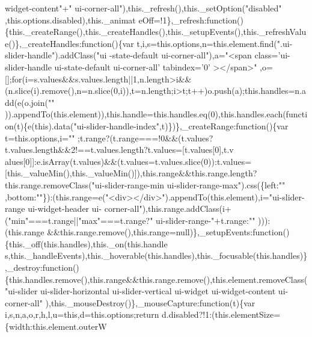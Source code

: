 \begin{DoxyCode}
{      widget-content\textcolor{stringliteral}{"+"} ui-corner-all\textcolor{stringliteral}{"),this.\_refresh(),this.\_setOption("}disabled\textcolor{stringliteral}{"
      ,this.options.disabled),this.\_animat
      eOff=!1\},\_refresh:function()\{this.\_createRange(),this.\_createHandles(),this.\_setupEvents(),this.\_refreshValue()\},\_createHandles:function()\{var t,i,s=this.options,n=this.element.find("}.ui-slider-handle\textcolor{stringliteral}{").addClass("}ui
      -state-\textcolor{keywordflow}{default} ui-corner-all\textcolor{stringliteral}{"),a="}<span \textcolor{keyword}{class}=\textcolor{stringliteral}{'ui-slider-handle ui-state-default ui-corner-all'} tabindex=\textcolor{charliteral}{'0'}
      ></span>\textcolor{stringliteral}{"
      ,o=[];for(i=s.values&&s.values.length||1,n.length>i&&(n.slice(i).remove(),n=n.slice(0,i)),t=n.length;i>t;t++)o.push(a);this.handles=n.add(e(o.join("}\textcolor{stringliteral}{"
      )).appendTo(this.element)),this.handle=this.handles.eq(0),this.handles.each(function(t)\{e(this).data("}ui-slider-handle-index\textcolor{stringliteral}{",t)\})\},\_createRange:function()\{var
       t=this.options,i="}\textcolor{stringliteral}{"
      ;t.range?(t.range===!0&&(t.values?t.values.length&&2!==t.values.length?t.values=[t.values[0],t.v
      alues[0]]:e.isArray(t.values)&&(t.values=t.values.slice(0)):t.values=[this.\_valueMin(),this.\_valueMin()]),this.range&&this.range.length?this.range.removeClass("}ui-slider-range-min ui-slider-range-max\textcolor{stringliteral}{").css(\{left:"}\textcolor{stringliteral}{"
      ,bottom:"}\textcolor{stringliteral}{"\}):(this.range=e("}<div></div>\textcolor{stringliteral}{").appendTo(this.element),i="}ui-slider-range ui-widget-header ui-
      corner-all\textcolor{stringliteral}{"),this.range.addClass(i+("}min\textcolor{stringliteral}{"===t.range||"}max\textcolor{stringliteral}{"===t.range?"} ui-slider-range-\textcolor{stringliteral}{"+t.range:"}\textcolor{stringliteral}{"
      ))):(this.range
      &&this.range.remove(),this.range=null)\},\_setupEvents:function()\{this.\_off(this.handles),this.\_on(this.handle
      s,this.\_handleEvents),this.\_hoverable(this.handles),this.\_focusable(this.handles)\},\_destroy:function()\{this.handles.remove(),this.range&&this.range.remove(),this.element.removeClass("}ui-slider ui-slider-horizontal 
      ui-slider-vertical ui-widget ui-widget-content ui-corner-all\textcolor{stringliteral}{"
      ),this.\_mouseDestroy()\},\_mouseCapture:function(t)\{var i,s,n,a,o,r,h,l,u=this,d=this.options;return
       d.disabled?!1:(this.elementSize=\{width:this.element.outerW
}}
\end{DoxyCode}
